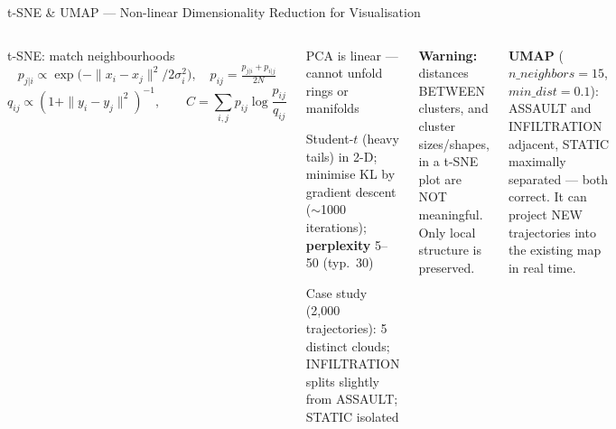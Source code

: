 \documentclass[aspectratio=169,10pt,t]{beamer}
\begin{document}
\begin{frame}{t-SNE \& UMAP --- Non-linear Dimensionality Reduction for Visualisation}
\begin{columns}[T]
\begin{fbx}{t-SNE: match neighbourhoods}\[p_{j|i}\propto\exp\!\big(-\|x_i-x_j\|^2/2\sigma_i^2\big),\quad p_{ij}=\tfrac{p_{j|i}+p_{i|j}}{2N}\]\[q_{ij}\propto(1+\|y_i-y_j\|^2)^{-1},\qquad C=\sum_{i,j}p_{ij}\log\frac{p_{ij}}{q_{ij}}\]\end{fbx}
\begin{tl}\item PCA is linear --- cannot unfold rings or manifolds\item Student-$t$ (heavy tails) in 2-D; minimise KL by gradient descent ($\sim$1000 iterations); \textbf{perplexity} 5--50 (typ.\ 30)\item Case study (2,000 trajectories): 5 distinct clouds; INFILTRATION splits slightly from ASSAULT; STATIC isolated\end{tl}
\begin{wbox}\scriptsize\textbf{Warning:} distances BETWEEN clusters, and cluster sizes/shapes, in a t-SNE plot are NOT meaningful. Only local structure is preserved.\end{wbox}
\begin{rbox}\scriptsize\textbf{UMAP} ($n\_neighbors=15$, $min\_dist=0.1$): ASSAULT and INFILTRATION adjacent, STATIC maximally separated --- both correct. It can project NEW trajectories into the existing map in real time.\end{rbox}
\end{columns}
\end{frame}
\end{document}
